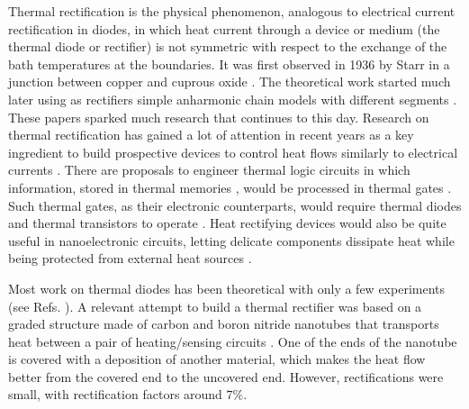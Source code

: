 Thermal rectification is the physical phenomenon, analogous to electrical current rectification in diodes, in which heat current through a device or medium (the thermal diode or rectifier) is not symmetric with respect to the exchange of the bath temperatures at the boundaries. It was  first observed in 1936 by Starr in a junction between copper and cuprous oxide \cite{Starr1936}. The theoretical work started much later using as rectifiers simple anharmonic chain models
with different segments \cite{Terraneo2002,Li2004}. These papers sparked much research that continues to this day. Research on thermal rectification has gained a lot of attention in recent years as a key ingredient to build prospective devices to control heat flows similarly to electrical currents \cite{Roberts2011,Li2012}. There are  proposals to engineer thermal logic circuits \cite{Ye2017} in which information, stored in thermal memories \cite{Wang2008}, would be processed in thermal gates \cite{Wang2007}. Such thermal gates, as their electronic counterparts,  would require thermal diodes and thermal transistors to operate \cite{Li2006,Joulain2016}.
Heat rectifying devices would also be quite useful in nanoelectronic circuits, letting delicate components dissipate heat while being protected from external heat sources \cite{Roberts2011}.

Most work on thermal diodes has been theoretical with only a few experiments (see Refs. \cite{Chang2006,Kobayashi2009,Leitner2013,Elzouka2017}).
A relevant attempt to build a thermal rectifier was based on a graded structure made of carbon and boron nitride nanotubes that transports heat between a pair of heating/sensing circuits \cite{Chang2006}. One of the ends of the nanotube is covered with a deposition of another material, which makes the heat flow better from the covered end to the uncovered end. However, rectifications were small, with rectification factors around $7\%$.

